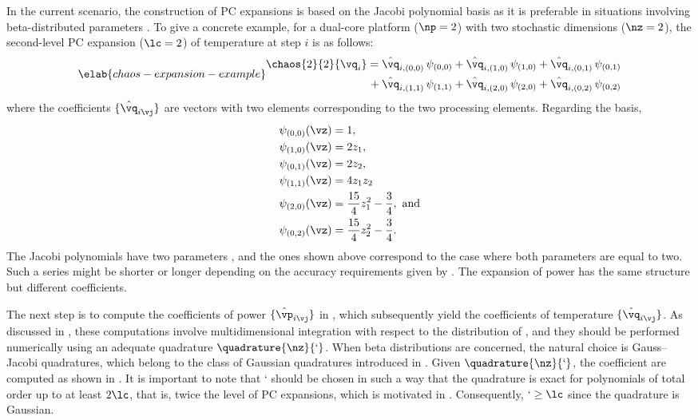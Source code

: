 In the current scenario, the construction of \ac{PC} expansions is based on the
Jacobi polynomial basis as it is preferable in situations involving
beta-distributed parameters \cite{xiu2010}. To give a concrete example, for a
dual-core platform ($\np = 2$) with two stochastic dimensions ($\nz = 2$), the
second-level \ac{PC} expansion ($\lc = 2$) of temperature at step $i$ is as
follows:
\begin{equation} \elab{chaos-expansion-example}
  \begin{split}
    \chaos{2}{2}{\vq_i}
    =    {} & \hat{\vq}_{i, (0, 0)} \, \psi_{(0, 0)} +
              \hat{\vq}_{i, (1, 0)} \, \psi_{(1, 0)} +
              \hat{\vq}_{i, (0, 1)} \, \psi_{(0, 1)} \\
    {} + {} & \hat{\vq}_{i, (1, 1)} \, \psi_{(1, 1)} +
              \hat{\vq}_{i, (2, 0)} \, \psi_{(2, 0)} +
              \hat{\vq}_{i, (0, 2)} \, \psi_{(0, 2)}
  \end{split}
\end{equation}
where the coefficients $\{ \hat{\vq}_{i \vj} \}$ are vectors with two elements
corresponding to the two processing elements. Regarding the basis,
\begin{align*}
  & \psi_{(0, 0)}(\vz) = 1, \\
  & \psi_{(1, 0)}(\vz) = 2 z_1, \\
  & \psi_{(0, 1)}(\vz) = 2 z_2, \\
  & \psi_{(1, 1)}(\vz) = 4 z_1 z_2 \\
  & \psi_{(2, 0)}(\vz) = \frac{15}{4} z_1^2 - \frac{3}{4}, \text{ and} \\
  & \psi_{(0, 2)}(\vz) = \frac{15}{4} z_2^2 - \frac{3}{4}.
\end{align*}
The Jacobi polynomials have two parameters \cite{xiu2010}, and the ones shown
above correspond to the case where both parameters are equal to two. Such a
series might be shorter or longer depending on the accuracy requirements given
by \lc. The expansion of power has the same structure but different
coefficients.

The next step is to compute the coefficients of power $\{ \hat{\vp}_{i \vj} \}$
in , which subsequently yield the coefficients of
temperature $\{ \hat{\vq}_{i \vj} \}$. As discussed in
, these computations involve multidimensional
integration with respect to the distribution of \vz, and they should be
performed numerically using an adequate quadrature $\quadrature{\nz}{\lq}$. When
beta distributions are concerned, the natural choice is Gauss--Jacobi
quadratures, which belong to the class of Gaussian quadratures introduced in
. Given $\quadrature{\nz}{\lq}$, the coefficient are
computed as shown in . It is important to note that \lq
should be chosen in such a way that the quadrature is exact for polynomials of
total order up to at least $2 \lc$, that is, twice the level of \ac{PC}
expansions, which is motivated in . Consequently, $\lq
\geq \lc$ since the quadrature is Gaussian.

